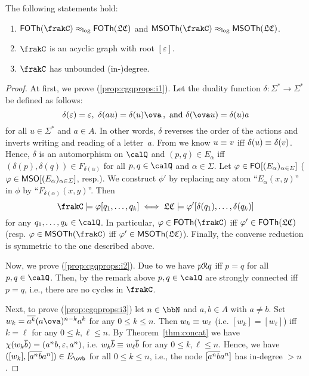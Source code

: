 \begin{proposition}\label{prop:cgqprops}
	The following statements hold:
	\begin{enumerate}[(1)]
		\item $\FOTh{\cQ}\eqlog\FOTh{\lcQ}$ and $\MSOTh{\cQ}\eqlog\MSOTh{\lcQ}$.\label{prop:cgqprops:i1}
		\item $\cQ$ is an acyclic graph with root $[\varepsilon]$.\label{prop:cgqprops:i2}
		\item $\cQ$ has unbounded (in-)degree.\label{prop:cgqprops:i3}
	\end{enumerate}
\end{proposition}
\begin{proof}
	At first, we prove (\ref{prop:cgqprops:i1}). Let the duality function $\delta\colon\varSigma^*\to\varSigma^*$ be defined as follows:
	\[\delta(\varepsilon)=\varepsilon,\ \delta(au)=\delta(u)\ova\,,\text{ and }\delta(\ova u)=\delta(u)a\]
	for all $u\in\varSigma^*$ and $a\in A$. In other words, $\delta$ reverses the order of the actions and inverts writing and reading of a letter~$a$. From \cite[Proposition~3.4]{HusKZ17} we know $u\equiv_{} v$ iff $\delta(u)\equiv_{}\delta(v)$. Hence, $\delta$ is an automorphism on $\Qx$ and $(p,q)\in E_\alpha$ iff $(\delta(p),\delta(q))\in F_{\delta(\alpha)}$ for all $p,q\in\Qx$ and $\alpha\in\varSigma$. Let $\varphi\in\mathsf{FO}[(E_\alpha)_{\alpha\in\varSigma}]$ ($\varphi\in\mathsf{MSO}[(E_\alpha)_{\alpha\in\varSigma}]$, resp.). We construct $\phi'$ by replacing any atom ``$E_\alpha(x,y)$'' in $\phi$ by ``$F_{\delta(\alpha)}(x,y)$''. Then
	\[\cQ\models\phi[q_1,\dots,q_k] \iff \lcQ\models\phi'[\delta(q_1),\dots,\delta(q_k)]\] for any $q_1,\dots,q_k\in\Qx$. In particular, $\phi\in\FOTh{\cQ}$ iff $\varphi'\in\mathsf{FOTh}(\mathfrak{LC})$ (resp. $\phi\in\MSOTh{\cQ}$ iff $\varphi'\in\mathsf{MSOTh}(\mathfrak{LC})$). Finally, the converse reduction is symmetric to the one described above.
	
	Now, we prove (\ref{prop:cgqprops:i2}). Due to \cite[Corollary~4.7]{HusKZ17} we have $p\mathcal{R} q$ iff $p=q$ for all $p,q\in\Qx$. Then, by the remark above $p,q\in\Qx$ are strongly connected iff $p=q$, i.e., there are no cycles in $\cQ$.
	
	Next, to prove (\ref{prop:cgqprops:i3}) let $n\in\bbN$ and $a,b\in A$ with $a\neq b$. Set $w_k=\ov{a^k}(a\ova)^{n-k}a^k$ for any $0\leq k\leq n$. Then $w_k\equiv_{} w_\ell$ (i.e. $[w_k]=[w_\ell]$) iff $k=\ell$ for any $0\leq k,\ell\leq n$. By Theorem~\ref{thm:concat} we have $\chi(w_k\overline{b})=(a^nb,\varepsilon,a^n)$, i.e. $w_k\overline{b}\equiv_{} w_\ell\overline{b}$ for any $0\leq k,\ell\leq n$. Hence, we have $([w_k],[\ov{a^nb}a^n])\in E_{\ovb}$ for all $0\leq k\leq n$, i.e., the node $[\overline{a^nb}a^n]$ has in-degree $>n$.
\end{proof}

